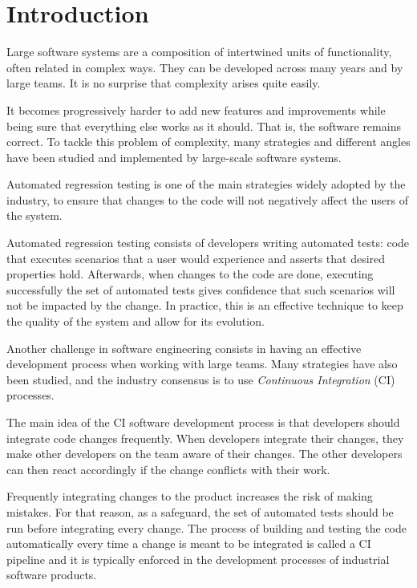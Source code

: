 \chapter{Introduction}\label{s:introduction}

Large software systems are a composition of intertwined units of functionality,
often related in complex ways. They can be developed across many years and by 
large teams. It is no surprise that complexity arises quite easily. 

It becomes progressively harder to add new features and improvements while being 
sure that everything else works as it should. That is, the software remains
correct. To tackle this problem of complexity, many strategies and different 
angles have been studied and implemented by large-scale software systems. 

Automated regression testing is one of the main strategies widely adopted by the industry,
to ensure that changes to the code will not negatively affect the users of the system. 

Automated regression testing consists of developers writing automated tests: code that executes scenarios that a user would experience
and asserts that desired properties hold. Afterwards, when changes to the code are done,
executing successfully the set of automated tests gives confidence that such scenarios will
not be impacted by the change. In practice, this is an effective technique to keep the quality of the system and
allow for its evolution. 

Another challenge in software engineering consists in having an effective development process when
working with large teams. Many strategies have also been studied, and the industry 
consensus is to use \emph{Continuous Integration} (CI) processes.

The main idea of the CI software development process is that developers should
integrate code changes frequently. When developers integrate their changes,
they make other developers on the team aware of their changes. The other developers
can then react accordingly if the change conflicts with their work.

Frequently integrating changes to the product increases the risk of making mistakes.
For that reason, as a safeguard, the set of automated tests should be run before 
integrating every change. The process of building and testing the code automatically
every time a change is meant to be integrated is called a CI pipeline and it is typically
enforced in the development processes of industrial software products.

